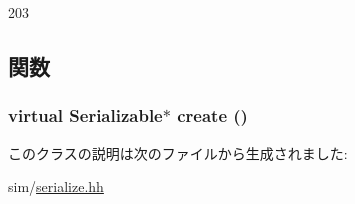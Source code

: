 \begin{DoxyCode}
203 {}
\end{DoxyCode}


\subsection{関数}
\hypertarget{classSerializableBuilder_abd61bfbe39e50daf69ea1e812b49934d}{
\subsubsection[{create}]{\setlength{\rightskip}{0pt plus 5cm}virtual {\bf Serializable}$\ast$ create ()}}
\label{classSerializableBuilder_abd61bfbe39e50daf69ea1e812b49934d}


このクラスの説明は次のファイルから生成されました:\begin{DoxyCompactItemize}
\item 
sim/\hyperlink{serialize_8hh}{serialize.hh}\end{DoxyCompactItemize}
